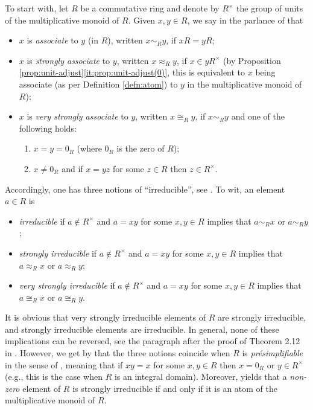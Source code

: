 To start with, let $R$ be a commutative ring and denote by $R^\times$ the group of units of the multiplicative monoid of $R$. Given $x, y \in R$, we say in the parlance of \cite[Definition 2.1]{AnVL96} that 
\begin{itemize}
	\item $x$ is \emph{associate} to $y$ (in $R$), written $x \sim_R y$, if $xR = yR$;
	\item $x$ is \emph{strongly associate} to $y$, written $x \approx_R y$, if $x \in yR^\times$ (by Proposition \ref{prop:unit-adjust}\ref{it:prop:unit-adjust(0)}, this is equivalent to $x$ being associate (as per Definition \ref{defn:atom}) to $y$ in the multiplicative monoid of $R$);
	\item $x$ is \emph{very strongly associate} to $y$, written $x \cong_R y$, if $x \sim_R y$ and one of the following holds:
	\begin{enumerate}[label = {\rm (\roman{*})}] 
		\item $x = y = 0_R$ (where $0_R$ is the zero of $R$);
		\item $x \neq 0_R$ and if $x = yz$ for some $z \in R$ then $z \in R^\times$.
	\end{enumerate}
\end{itemize}
%
Accordingly, one has three notions of ``irreducible'', see \cite[Definition 2.4]{AnVL96}. To wit, an element $a \in R$ is 
\begin{itemize}
	\item \emph{irreducible} if $a \notin R^\times$ and $a=xy$ for some $x, y \in R$ implies that $a \sim_R x$ or $a \sim_R y$;
	\item \emph{strongly irreducible} if $a \notin R^\times$ and $a=xy$ for some $x, y \in R$ implies that $a \approx_R x$ or $a \approx_R y$;
	\item \emph{very strongly irreducible} if $a \notin R^\times$ and $a=xy$ for some $x, y \in R$ implies that $a \cong_R x$ or $a \cong_R y$.
\end{itemize}
It is obvious that very strongly irreducible elements of $R$ are strongly irreducible, and strongly irreducible elements are irreducible. In general, none of these implications can be reversed, see the paragraph after the proof of Theorem 2.12 in \cite{AnVL96}. However, we get by \cite[Theorem 2.2(3)]{AnVL96} that the three notions coincide when $R$ is \emph{pr\'esimplifiable} in the sense of \cite{Bou74a}, meaning that if $xy = x$ for some $x, y \in R$ then $x = 0_R$ or $y \in R^\times$ (e.g., this is the case when $R$ is an integral domain). Moreover, \cite[Theorem 2.5]{AnVL96} yields that a \emph{non-zero} element of $R$ is strongly irreducible if and only if it is an atom of the multiplicative monoid of $R$.

